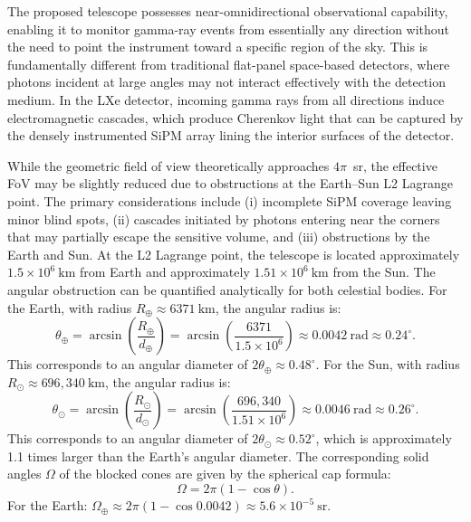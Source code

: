 \documentclass{aastex701}
\begin{document}
The proposed telescope possesses near-omnidirectional observational capability, enabling it to monitor gamma-ray events from essentially any direction without the need to point the instrument toward a specific region of the sky. This is fundamentally different from traditional flat-panel space-based detectors, where photons incident at large angles may not interact effectively with the detection medium. In the LXe detector, incoming gamma rays from all directions induce electromagnetic cascades, which produce Cherenkov light that can be captured by the densely instrumented SiPM array lining the interior surfaces of the detector. 

While the geometric field of view theoretically approaches $4\pi$~sr, the effective FoV may be slightly reduced due to obstructions at the Earth–Sun L2 Lagrange point. The primary considerations include (i) incomplete SiPM coverage leaving minor blind spots, (ii) cascades initiated by photons entering near the corners that may partially escape the sensitive volume, and (iii) obstructions by the Earth and Sun. At the L2 Lagrange point, the telescope is located approximately $1.5\times 10^6~\mathrm{km}$ from Earth and approximately $1.51\times 10^6~\mathrm{km}$ from the Sun. The angular obstruction can be quantified analytically for both celestial bodies.
For the Earth, with radius $R_\oplus \approx 6371~\mathrm{km}$, the angular radius is:
\begin{equation}
\theta_\oplus = \arcsin\left(\frac{R_\oplus}{d_\oplus}\right) = \arcsin\left(\frac{6371}{1.5\times 10^6}\right) \approx 0.0042~\mathrm{rad} \approx 0.24^\circ.
\end{equation}
This corresponds to an angular diameter of $2\theta_\oplus \approx 0.48^\circ$. For the Sun, with radius $R_\odot \approx 696{,}340~\mathrm{km}$, the angular radius is:
\begin{equation}
\theta_\odot = \arcsin\left(\frac{R_\odot}{d_\odot}\right) = \arcsin\left(\frac{696{,}340}{1.51\times 10^6}\right) \approx 0.0046~\mathrm{rad} \approx 0.26^\circ.
\end{equation}
This corresponds to an angular diameter of $2\theta_\odot \approx 0.52^\circ$, which is approximately 1.1 times larger than the Earth's angular diameter. The corresponding solid angles $\Omega$ of the blocked cones are given by the spherical cap formula:
\begin{equation}
\Omega = 2\pi \left(1 - \cos\theta\right).
\end{equation}
For the Earth: $\Omega_\oplus \approx 2\pi (1 - \cos 0.0042) \approx 5.6\times 10^{-5}~\mathrm{sr}$.
\end{document}
